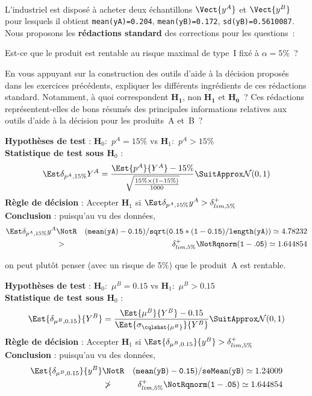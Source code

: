 \documentclass[10pt]{report}
\begin{document}
\begin{exercice}$ $\\
L'industriel est disposé à acheter deux échantillons $\Vect{y^A}$ et $\Vect{y^B}$ pour lesquels il obtient \texttt{mean(yA)=0.204}, \texttt{mean(yB)=0.172}, \texttt{sd(yB)=0.5610087}. Nous proposons les \textbf{rédactions standard} des corrections pour les questions~:
\begin{center}
Est-ce que le produit est rentable au risque maximal de type~I fixé à $\alpha=5\%$~?
\end{center}
En vous appuyant sur la construction des outils d'aide à la décision proposés dans les exercices précédents, expliquer les différents ingrédients de ces rédactions standard. Notamment, à quoi correspondent $\mathbf{H_1}$, non $\mathbf{H_1}$ et $\mathbf{H_0}$~?
Ces rédactions représentent-elles de bons résumés des principales informations relatives aux outils d'aide à la décision pour les produits~A et~B~?

\noindent {}\hrulefill

\noindent \textbf{Hypothèses de test} : $\mathbf{H}_0:$ $p^{A}=15\%$ vs {\large $\mathbf{H}_1:$ $p^{A}>15\%$}\\
\textbf{Statistique de test sous $\mathbf{H}_0$} :
  $$
  \Est{\delta_{p^{A},15\%}}{Y^{A}}= {\displaystyle \frac{\Est{p^{A}}{Y^{A}}-15\%}{
\sqrt{\frac{15\%\times (1-15\%)} {1000}}
}} 
  \SuitApprox \mathcal{N}(0,1)
  $$
\textbf{Règle de décision} : Accepter $\mathbf{H}_1$ si 
  $\Est{\delta_{p^{A},15\%}}{y^{A}} > \delta^+_{lim,5\%}$\\
\noindent \textbf{Conclusion} :
puisqu'au vu des données, 
  \begin{eqnarray*}
\Est{\delta_{p^{A},15\%}}{y^{A}} &\NotR&\mathtt{(mean(yA)-0.15)/sqrt(0.15*(1-0.15)/length(yA))}\simeq 4.78232\\& >  & \delta^+_{lim,5\%} \NotR \mathtt{qnorm(1-.05)}\simeq1.644854
\end{eqnarray*}
  
on peut plutôt penser (avec un risque de 5\%) que le produit~A est rentable.

\noindent {}\hrulefill

\noindent \textbf{Hypothèses de test} : $\mathbf{H}_0:$ $\mu^{B}=0.15$ vs {\large $\mathbf{H}_1:$ $\mu^{B}>0.15$}\\
\textbf{Statistique de test sous $\mathbf{H}_0$} :
  $$
  \Est{\delta_{\mu^{B},0.15}}{Y^{B}}= {\displaystyle \frac{\Est{\mu^{B}}{Y^{B}}-0.15}{
\Est{\sigma_{\cqlshat{\mu^{B}}}}{Y^{B}}
}} 
  \SuitApprox \mathcal{N}(0,1)
  $$
\textbf{Règle de décision} : Accepter $\mathbf{H}_1$ si 
  $\Est{\delta_{\mu^{B},0.15}}{y^{B}} > \delta^+_{lim,5\%}$\\
\noindent \textbf{Conclusion} :
puisqu'au vu des données, 
  \begin{eqnarray*}
\Est{\delta_{\mu^{B},0.15}}{y^{B}} &\NotR&\mathtt{(mean(yB)-0.15)/seMean(yB)}\simeq 1.24009\\&\ngtr & \delta^+_{lim,5\%} \NotR \mathtt{qnorm(1-.05)}\simeq1.644854
\end{eqnarray*}
  

\end{exercice}
\end{document}
